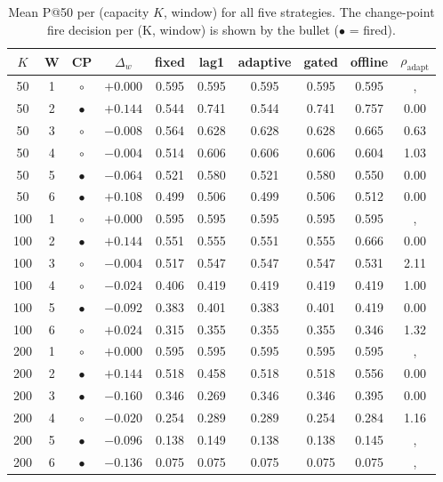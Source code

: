 \begin{table}[!t]
  \caption{Mean P@50 per (capacity $K$, window) for all five strategies. The change-point fire decision per (K, window) is shown by the bullet ($\bullet$ = fired).}
  \label{tab:main}
  \centering
  \small
  \setlength{\tabcolsep}{5pt}
  \begin{tabular}{cccc ccccc c}
    \toprule
    $K$ & W & CP & $\Delta_w$ & fixed & lag1 & adaptive & gated & offline & $\rho_{\mathrm{adapt}}$ \\
    \midrule
    50 & 1 & $\circ$ & $+0.000$ & 0.595 & 0.595 & 0.595 & 0.595 & 0.595 &, \\
    50 & 2 & $\bullet$ & $+0.144$ & 0.544 & 0.741 & 0.544 & 0.741 & 0.757 & 0.00 \\
    50 & 3 & $\circ$ & $-0.008$ & 0.564 & 0.628 & 0.628 & 0.628 & 0.665 & 0.63 \\
    50 & 4 & $\circ$ & $-0.004$ & 0.514 & 0.606 & 0.606 & 0.606 & 0.604 & 1.03 \\
    50 & 5 & $\bullet$ & $-0.064$ & 0.521 & 0.580 & 0.521 & 0.580 & 0.550 & 0.00 \\
    50 & 6 & $\bullet$ & $+0.108$ & 0.499 & 0.506 & 0.499 & 0.506 & 0.512 & 0.00 \\
    \midrule
    100 & 1 & $\circ$ & $+0.000$ & 0.595 & 0.595 & 0.595 & 0.595 & 0.595 &, \\
    100 & 2 & $\bullet$ & $+0.144$ & 0.551 & 0.555 & 0.551 & 0.555 & 0.666 & 0.00 \\
    100 & 3 & $\circ$ & $-0.004$ & 0.517 & 0.547 & 0.547 & 0.547 & 0.531 & 2.11 \\
    100 & 4 & $\circ$ & $-0.024$ & 0.406 & 0.419 & 0.419 & 0.419 & 0.419 & 1.00 \\
    100 & 5 & $\bullet$ & $-0.092$ & 0.383 & 0.401 & 0.383 & 0.401 & 0.419 & 0.00 \\
    100 & 6 & $\circ$ & $+0.024$ & 0.315 & 0.355 & 0.355 & 0.355 & 0.346 & 1.32 \\
    \midrule
    200 & 1 & $\circ$ & $+0.000$ & 0.595 & 0.595 & 0.595 & 0.595 & 0.595 &, \\
    200 & 2 & $\bullet$ & $+0.144$ & 0.518 & 0.458 & 0.518 & 0.518 & 0.556 & 0.00 \\
    200 & 3 & $\bullet$ & $-0.160$ & 0.346 & 0.269 & 0.346 & 0.346 & 0.395 & 0.00 \\
    200 & 4 & $\circ$ & $-0.020$ & 0.254 & 0.289 & 0.289 & 0.254 & 0.284 & 1.16 \\
    200 & 5 & $\bullet$ & $-0.096$ & 0.138 & 0.149 & 0.138 & 0.138 & 0.145 &, \\
    200 & 6 & $\bullet$ & $-0.136$ & 0.075 & 0.075 & 0.075 & 0.075 & 0.075 &, \\
    \bottomrule
  \end{tabular}
\end{table}
